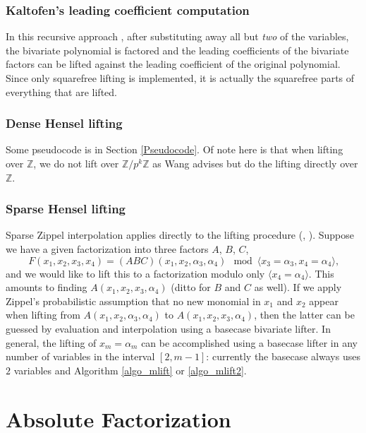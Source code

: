 \documentclass[11pt,reqno]{amsart}
\numberwithin{equation}{section}
\begin{document}
\subsubsection{Kaltofen's leading coefficient computation}
In this recursive approach \cite{KALTOFEN}, after substituting away all but
\emph{two} of the variables, the bivariate polynomial is factored and the
leading coefficients of the bivariate factors can be lifted against the leading
coefficient of the original polynomial. Since only squarefree lifting is
implemented, it is actually the squarefree parts of everything that are lifted.

\subsubsection{Dense Hensel lifting}
Some pseudocode is in Section \ref{Pseudocode}. Of note here is that when
lifting over $\mathbb{Z}$, we do not lift over $\mathbb{Z}/p^k\mathbb{Z}$ as
Wang \cite{WANG} advises but do the lifting directly over $\mathbb{Z}$.

\subsubsection{Sparse Hensel lifting}
Sparse Zippel interpolation applies directly to the lifting procedure
(\cite{SHLZIP}, \cite{SHL}). Suppose we have a given factorization into three
factors $A$, $B$, $C$,
\begin{equation*}
F(x_1, x_2, x_3, x_4) = (A B C)(x_1, x_2, \alpha_3, \alpha_4) \mod \langle x_3
=\alpha_3, x_4=\alpha_4 \rangle\text{,}
\end{equation*}
and we would like to lift this to a factorization modulo only $\langle
x_4=\alpha_4 \rangle$. This amounts to finding $A(x_1, x_2, x_3, \alpha_4)$
(ditto for $B$ and $C$ as well). If we apply Zippel's probabilistic assumption
that no new monomial in $x_1$ and $x_2$ appear when lifting from $A(x_1, x_2,
\alpha_3, \alpha_4)$ to $A(x_1, x_2, x_3, \alpha_4)$, then the latter can be
guessed by evaluation and interpolation using a basecase bivariate lifter. In
general, the lifting of $x_m = \alpha_m$ can be accomplished using a basecase
lifter in any number of variables in the interval $[2,m-1]$: currently the
basecase always uses $2$ variables and Algorithm \ref{algo_mlift} or
\ref{algo_mlift2}.

\section{Absolute Factorization}
\end{document}

